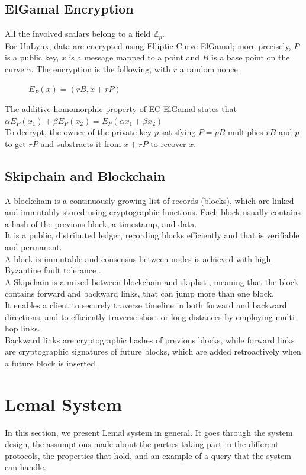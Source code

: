 \documentclass{article}
\begin{document}
\subsection{ElGamal Encryption}
All the involved scalars belong to a field $\mathbb{Z}_p$.\\
For UnLynx, data are encrypted using Elliptic Curve ElGamal; more precisely, $P$ is a public key, $x$ is a message mapped to a point and $B$ is a base point on the curve $\gamma$. The encryption is the following, with $r$ a random nonce:\\
\begin{figure}[H]
\center
$E_P(x) = (rB,x+rP)$
\end{figure}
The additive homomorphic property of EC-ElGamal states that $\alpha E_P(x_1) + \beta E_P(x_2) = E_P(\alpha x_1+ \beta x_2)$\\
To decrypt, the owner of the private key $p$ satisfying $P = pB$ multiplies $rB$ and $p$ to get $rP$ and substracts it from $x + rP$ to recover $x$.\\

\subsection{Skipchain and Blockchain}
A blockchain is a continuously growing list of records (blocks), which are linked and immutably stored using cryptographic functions. Each block usually contains a hash of the previous block, a timestamp, and data.\\
It is a public, distributed ledger, recording blocks efficiently and that is verifiable and permanent.\\
A block is immutable and consensus between nodes is achieved with high Byzantine fault tolerance \cite{bft}.\\
A Skipchain is a mixed between blockchain and skiplist \cite{skiplist}, meaning that the block contains forward and backward links, that can jump more than one block.\\
It enables a client to securely traverse timeline in both forward and backward directions, and to efficiently traverse short or long distances by employing multi-hop links.\\
Backward links are cryptographic hashes of previous blocks, while forward links are cryptographic signatures of future blocks, which are added retroactively when a future block is inserted.



\section{Lemal System}
In this section, we present Lemal \cite{lemal} system in general. It goes through the system design, the assumptions made about the parties taking part in the different protocols, the properties that hold, and an example of a query that the system can handle.\\
\end{document}
